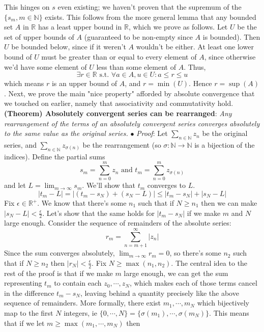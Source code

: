 \documentclass{article}
\newcommand*{\tb}{\textbf}
\newcommand*{\ti}{\textit}
\newcommand*{\n}{\newline}
\newcommand*{\nn}{\newline \newline}
\newcommand*{\Pf}{\indent \ensuremath{\bullet} \textit{Proof}: }
\newcommand*{\N}{\mathbb{N}}
\newcommand*{\R}{\mathbb{R}}
\newcommand*{\st}{\text{ s.t. }}
\begin{document}
\n
This hinges on $ s $ even existing; we haven't proven that the supremum of the $ \{ s_m, m \in \N \} $ exists. This follows from the more general lemma that any bounded set $ A $ in $ \R $ has a least upper bound in $ \R $, which we prove as follows. Let $ U $ be the set of upper bounds of $ A $ (guaranteed to be non-empty since $ A $ is bounded). Then $ U $ be bounded below, since if it weren't $ A $ wouldn't be either. At least one lower bound of $ U $ must be greater than or equal to every element of $ A $, since otherwise we'd have some element of $ U $ less than some element of $ A $. Thus,
    $$ \exists r \in \R \st \forall a \in A, u \in U: a \leq r \leq u $$
which means $ r $ is an upper bound of $ A $, and $ r = \min(U) $. Hence $ r = \sup(A) $. \qedsymbol
\nn
Next, we prove the main "nice property" afforded by absolute convergence that we touched on earlier, namely that associativity and commutativity hold.
\nn
\tb{(Theorem) Absolutely convergent series can be rearranged}: \ti{Any rearrangement of the terms of an absolutely convergent series converges absolutely to the same value as the original series.}
\n
\Pf Let $ \sum_{n \in \N} z_n $ be the original series, and $ \sum_{n \in \N} z_{\sigma(n)} $ be the rearrangement (so $ \sigma: \N \rightarrow \N $ is a bijection of the indices). Define the partial sums
    $$ s_m = \sum_{n = 0}^m z_n \text{ and } t_m = \sum_{n = 0}^m z_{\sigma(n)} $$
and let $ L = \lim_{m \to \infty} s_m $. We'll show that $ t_m $ converges to $ L $.
    $$ | t_m - L | = | (t_m - s_N) + (s_N - L) | \leq | t_m - s_N | + | s_N - L | $$
Fix $ \epsilon \in \R^+ $. We know that there's some $ n_1 $ such that if $ N \geq n_1 $ then we can make $ | s_N - L | < \frac{\epsilon}{2} $. Let's show that the same holds for $ | t_m - s_N | $ if we make $ m $ and $ N $ large enough. Consider the sequence of remainders of the absolute series:
    $$ r_m = \sum_{n = m + 1}^\infty | z_n | $$
Since the sum converges absolutely, $ \lim_{m \to \infty} r_m = 0 $, so there's some $ n_2 $ such that if $ N \geq n_2 $ then $ | r_N | < \frac{\epsilon}{2} $. Fix $ N \geq \max(n_1, n_2) $. The central idea to the rest of the proof is that if we make $ m $ large enough, we can get the sum representing $ t_m $ to contain each $ z_0, \cdots, z_N $, which makes each of those terms cancel in the difference $ t_m - s_N $, leaving behind a quantity precisely like the above sequence of remainders. More formally, there exist $ m_1, \cdots, m_N $ which bijectively map to the first $ N $ integers, ie $ \{ 0, \cdots, N \} = \{ \sigma(m_1), \cdots, \sigma(m_N) \} $. This means that if we let $ m \geq \max(m_1, \cdots, m_N) $ then
\end{document}
